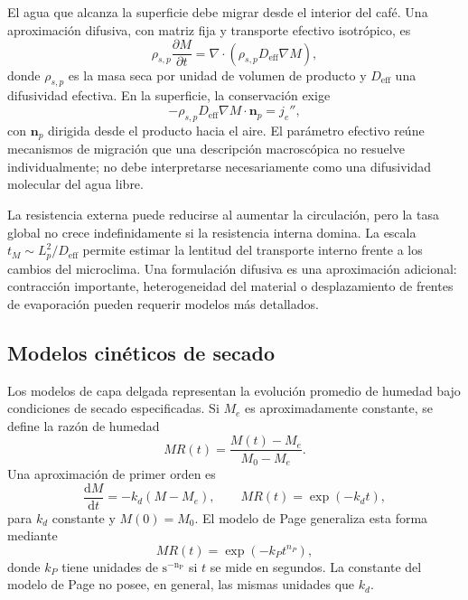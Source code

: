 El agua que alcanza la superficie debe migrar desde el interior del café. Una aproximación difusiva, con matriz fija y transporte efectivo isotrópico, es
\begin{equation}
\rho_{s,p}\frac{\partial M}{\partial t}
=\nabla\cdot\left(\rho_{s,p}D_{\mathrm{eff}}\nabla M\right),
\label{eq:diffusion_humedad_producto}
\end{equation}
donde $\rho_{s,p}$ es la masa seca por unidad de volumen de producto y $D_{\mathrm{eff}}$ una difusividad efectiva. En la superficie, la conservación exige
\begin{equation}
-\rho_{s,p}D_{\mathrm{eff}}\nabla M\cdot\mathbf n_p=j_e'',
\label{eq:frontera_humedad_producto}
\end{equation}
con $\mathbf n_p$ dirigida desde el producto hacia el aire. El parámetro efectivo reúne mecanismos de migración que una descripción macroscópica no resuelve individualmente; no debe interpretarse necesariamente como una difusividad molecular del agua libre.

La resistencia externa puede reducirse al aumentar la circulación, pero la tasa global no crece indefinidamente si la resistencia interna domina. La escala $t_M\sim L_p^2/D_{\mathrm{eff}}$ permite estimar la lentitud del transporte interno frente a los cambios del microclima. Una formulación difusiva es una aproximación adicional: contracción importante, heterogeneidad del material o desplazamiento de frentes de evaporación pueden requerir modelos más detallados.

\subsection{Modelos cinéticos de secado}
\label{subsec:cinetica_secado}

Los modelos de capa delgada representan la evolución promedio de humedad bajo condiciones de secado especificadas. Si $M_e$ es aproximadamente constante, se define la razón de humedad
\begin{equation}
MR(t)=\frac{M(t)-M_e}{M_0-M_e}.
\label{eq:moisture_ratio}
\end{equation}
Una aproximación de primer orden es
\begin{equation}
\frac{\mathrm{d}M}{\mathrm{d}t}=-k_d(M-M_e),
\qquad
MR(t)=\exp(-k_dt),
\label{eq:cinetica_primer_orden}
\end{equation}
para $k_d$ constante y $M(0)=M_0$. El modelo de Page generaliza esta forma mediante
\begin{equation}
MR(t)=\exp(-k_Pt^{n_P}),
\label{eq:modelo_page}
\end{equation}
donde $k_P$ tiene unidades de $\mathrm{s^{-n_P}}$ si $t$ se mide en segundos. La constante del modelo de Page no posee, en general, las mismas unidades que $k_d$.

